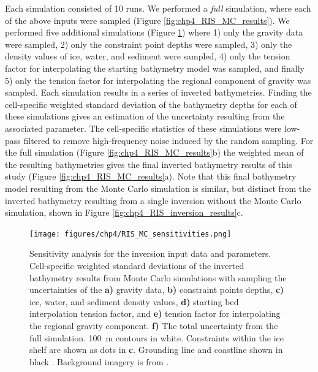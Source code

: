 Each simulation consisted of 10 runs. We performed a \textit{full} simulation, where each of the above inputs were sampled (Figure \ref{fig:chp4_RIS_MC_results}). We performed five additional simulations (Figure \ref{fig:chp4_RIS_MC_sensitivity}) where 1) only the gravity data were sampled, 2) only the constraint point depths were sampled, 3) only the density values of ice, water, and sediment were sampled, 4) only the tension factor for interpolating the starting bathymetry model was sampled, and finally 5) only the tension factor for interpolating the regional component of gravity was sampled. Each simulation results in a series of inverted bathymetries. Finding the cell-specific weighted standard deviation of the bathymetry depths for each of these simulations gives an estimation of the uncertainty resulting from the associated parameter. The cell-specific statistics of these simulations were low-pass filtered to remove high-frequency noise induced by the random sampling. For the full simulation (Figure \ref{fig:chp4_RIS_MC_results}b) the weighted mean of the resulting bathymetries gives the final inverted bathymetry results of this study (Figure \ref{fig:chp4_RIS_MC_results}a). Note that this final bathymetry model resulting from the Monte Carlo simulation is similar, but distinct from the inverted bathymetry resulting from a single inversion without the Monte Carlo simulation, shown in Figure \ref{fig:chp4_RIS_inversion_results}c. \\

\begin{figure}[!ht]
    \centering
    \texttt{[image: figures/chp4/RIS\_MC\_sensitivities.png]}
    \caption[Monte Carlo results]{Sensitivity analysis for the inversion input data and parameters. Cell-specific weighted standard deviations of the inverted bathymetry results from Monte Carlo simulations with sampling the uncertainties of the \textbf{a)} gravity data, \textbf{b)} constraint points depths, \textbf{c)} ice, water, and sediment density values, \textbf{d)} starting bed interpolation tension factor, and \textbf{e)} tension factor for interpolating the regional gravity component. \textbf{f)} The total uncertainty from the full simulation. 100~m contours in white. Constraints within the ice shelf are shown as dots in \textbf{c}. Grounding line and coastline shown in black \citep{morlighemmeasures2022}. Background imagery is from \citet{scambosmodisbased2007}.}
    \label{fig:chp4_RIS_MC_sensitivity}
\end{figure}

